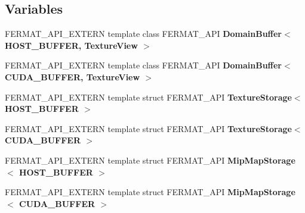 \subsection*{Variables}
\begin{DoxyCompactItemize}
\item 
\mbox{\label{group___textures_module_ga1fe67133ba5fdedbf564aae35203f335}} 
F\+E\+R\+M\+A\+T\+\_\+\+A\+P\+I\+\_\+\+E\+X\+T\+E\+RN template class F\+E\+R\+M\+A\+T\+\_\+\+A\+PI {\bfseries Domain\+Buffer$<$ H\+O\+S\+T\+\_\+\+B\+U\+F\+F\+E\+R, Texture\+View $>$}
\item 
\mbox{\label{group___textures_module_ga5aece62a851f66d4b2c3236ab9658f16}} 
F\+E\+R\+M\+A\+T\+\_\+\+A\+P\+I\+\_\+\+E\+X\+T\+E\+RN template class F\+E\+R\+M\+A\+T\+\_\+\+A\+PI {\bfseries Domain\+Buffer$<$ C\+U\+D\+A\+\_\+\+B\+U\+F\+F\+E\+R, Texture\+View $>$}
\item 
\mbox{\label{group___textures_module_ga28bacf6b37b17d33e0952230222a4507}} 
F\+E\+R\+M\+A\+T\+\_\+\+A\+P\+I\+\_\+\+E\+X\+T\+E\+RN template struct F\+E\+R\+M\+A\+T\+\_\+\+A\+PI {\bfseries Texture\+Storage$<$ H\+O\+S\+T\+\_\+\+B\+U\+F\+F\+E\+R $>$}
\item 
\mbox{\label{group___textures_module_gaa68fd3fb87aecadaede3a441f9347120}} 
F\+E\+R\+M\+A\+T\+\_\+\+A\+P\+I\+\_\+\+E\+X\+T\+E\+RN template struct F\+E\+R\+M\+A\+T\+\_\+\+A\+PI {\bfseries Texture\+Storage$<$ C\+U\+D\+A\+\_\+\+B\+U\+F\+F\+E\+R $>$}
\item 
\mbox{\label{group___textures_module_gaa6144ece5b83804020fe97f01a01a71a}} 
F\+E\+R\+M\+A\+T\+\_\+\+A\+P\+I\+\_\+\+E\+X\+T\+E\+RN template struct F\+E\+R\+M\+A\+T\+\_\+\+A\+PI {\bfseries Mip\+Map\+Storage$<$ H\+O\+S\+T\+\_\+\+B\+U\+F\+F\+E\+R $>$}
\item 
\mbox{\label{group___textures_module_ga87d3981e4857c3f7cceeae5cf43a1810}} 
F\+E\+R\+M\+A\+T\+\_\+\+A\+P\+I\+\_\+\+E\+X\+T\+E\+RN template struct F\+E\+R\+M\+A\+T\+\_\+\+A\+PI {\bfseries Mip\+Map\+Storage$<$ C\+U\+D\+A\+\_\+\+B\+U\+F\+F\+E\+R $>$}
\end{DoxyCompactItemize}
